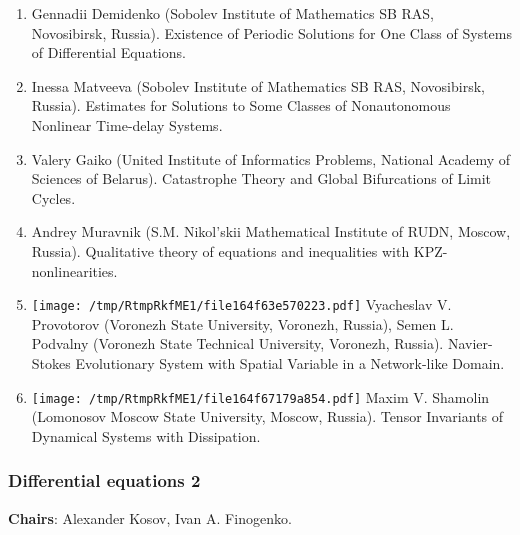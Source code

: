 \documentclass[
]{article}
\providecommand{\tightlist}{%
  \setlength{\itemsep}{0pt}\setlength{\parskip}{0pt}}
\begin{document}
\begin{enumerate}
\def\labelenumi{\arabic{enumi}.}
\tightlist
\item
  Gennadii Demidenko (Sobolev Institute of Mathematics SB RAS,
  Novosibirsk, Russia). Existence of Periodic Solutions for One Class of
  Systems of Differential Equations.
\item
  Inessa Matveeva (Sobolev Institute of Mathematics SB RAS, Novosibirsk,
  Russia). Estimates for Solutions to Some Classes of Nonautonomous
  Nonlinear Time-delay Systems.
\item
  Valery Gaiko (United Institute of Informatics Problems, National
  Academy of Sciences of Belarus). Catastrophe Theory and Global
  Bifurcations of Limit Cycles.
\item
  Andrey Muravnik (S.M. Nikol'skii Mathematical Institute of RUDN,
  Moscow, Russia). Qualitative theory of equations and inequalities with
  KPZ-nonlinearities.
\item
  \protect\texttt{[image: /tmp/RtmpRkfME1/file164f63e570223.pdf]}
  Vyacheslav V. Provotorov (Voronezh State University, Voronezh,
  Russia), Semen L. Podvalny (Voronezh State Technical University,
  Voronezh, Russia). Navier-Stokes Evolutionary System with Spatial
  Variable in a Network-like Domain.
\item
  \protect\texttt{[image: /tmp/RtmpRkfME1/file164f67179a854.pdf]}
  Maxim V. Shamolin (Lomonosov Moscow State University, Moscow, Russia).
  Tensor Invariants of Dynamical Systems with Dissipation.
\end{enumerate}

\hypertarget{de2}{%
\subsubsection{Differential equations 2}\label{de2}}

\textbf{Chairs}: Alexander Kosov, Ivan A. Finogenko.
\end{document}
